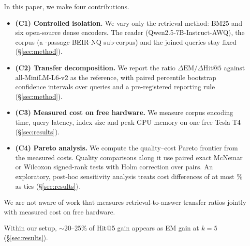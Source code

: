 In this paper, we make four contributions.
\begin{itemize}
\item \textbf{(C1) Controlled isolation.} We vary only the retrieval method: BM25 and six open-source dense encoders. The reader (Qwen2.5-7B-Instruct-AWQ), the corpus (a -passage BEIR-NQ sub-corpus) and the  joined queries stay fixed (\S\ref{sec:method}).
\item \textbf{(C2) Transfer decomposition.} We report the ratio $\Delta\mathrm{EM}/\Delta\mathrm{Hit@5}$ against all-MiniLM-L6-v2 as the reference, with paired percentile bootstrap confidence intervals over queries and a pre-registered reporting rule (\S\ref{sec:method}).
\item \textbf{(C3) Measured cost on free hardware.} We measure corpus encoding time, query latency, index size and peak GPU memory on one free Tesla T4 (\S\ref{sec:results}).
\item \textbf{(C4) Pareto analysis.} We compute the quality--cost Pareto frontier from the measured costs. Quality comparisons along it use paired exact McNemar or Wilcoxon signed-rank tests with Holm correction over  pairs. An exploratory, post-hoc sensitivity analysis treats cost differences of at most \% as ties (\S\ref{sec:results}).
\end{itemize}
We are not aware of work that measures retrieval-to-answer transfer ratios jointly with measured cost on free hardware.

Within our setup, $\sim$20--25\% of Hit@5 gain appears as EM gain at $k{=}5$ (\S\ref{sec:results}).
